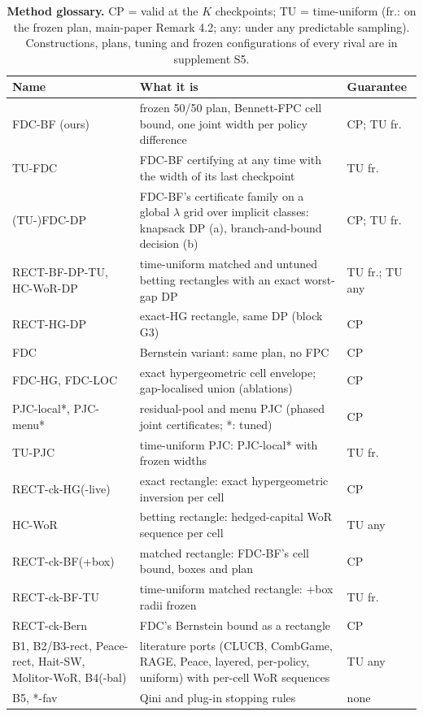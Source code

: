 \documentclass[sigconf,anonymous,review]{acmart}
\begin{document}
\begin{table}[H]
\caption{\textbf{Method glossary.} CP = valid at the $K$ checkpoints; TU = time-uniform (fr.: on the frozen plan, main-paper Remark 4.2; any: under any predictable sampling). Constructions, plans, tuning and frozen configurations of every rival are in supplement S5.}
\label{tab:glossary}
\footnotesize
\setlength{\tabcolsep}{3pt}
\begin{tabular}{@{}>{\raggedright\arraybackslash}p{2.05cm}>{\raggedright\arraybackslash}p{4.05cm}>{\raggedright\arraybackslash}p{1.25cm}@{}}
\toprule
Name & What it is & Guarantee \\
\midrule
FDC-BF (ours) & frozen 50/50 plan, Bennett-FPC cell bound, one joint width per policy difference & CP; TU fr. \\
TU-FDC & FDC-BF certifying at any time with the width of its last checkpoint & TU fr. \\
(TU-)FDC-DP & FDC-BF's certificate family on a global $\lambda$ grid over implicit classes: knapsack DP (a), branch-and-bound decision (b) & CP; TU fr. \\
RECT-BF-DP-TU, HC-WoR-DP & time-uniform matched and untuned betting rectangles with an exact worst-gap DP & TU fr.; TU any \\
RECT-HG-DP & exact-HG rectangle, same DP (block G3) & CP \\
FDC & Bernstein variant: same plan, no FPC & CP \\
FDC-HG, FDC-LOC & exact hypergeometric cell envelope; gap-localised union (ablations) & CP \\
PJC-local*, PJC-menu* & residual-pool and menu PJC (phased joint certificates; *: tuned) & CP \\
TU-PJC & time-uniform PJC: PJC-local* with frozen widths & TU fr. \\
RECT-ck-HG(-live) & exact rectangle: exact hypergeometric inversion per cell & CP \\
HC-WoR & betting rectangle: hedged-capital WoR sequence per cell & TU any \\
RECT-ck-BF(+box) & matched rectangle: FDC-BF's cell bound, boxes and plan & CP \\
RECT-ck-BF-TU & time-uniform matched rectangle: +box radii frozen & TU fr. \\
RECT-ck-Bern & FDC's Bernstein bound as a rectangle & CP \\
B1, B2/B3-rect, Peace-rect, Hait-SW, Molitor-WoR, B4(-bal) & literature ports (CLUCB, CombGame, RAGE, Peace, layered, per-policy, uniform) with per-cell WoR sequences & TU any \\
B5, *-fav & Qini and plug-in stopping rules & none \\
\bottomrule
\end{tabular}
\end{table}
\end{document}
